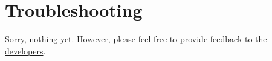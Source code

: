 
\chapter{Troubleshooting}

Sorry, nothing yet.
However, please feel free to \href{http://sourceforge.net/projects/powerfactory-fmu/support}{provide feedback to the developers}.